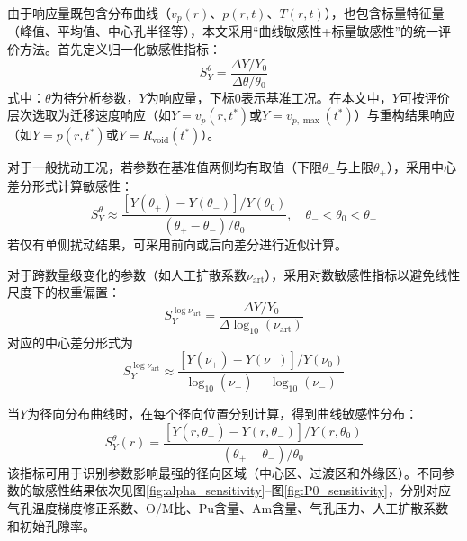 由于响应量既包含分布曲线（$v_p(r)$、$p(r,t)$、$T(r,t)$），也包含标量特征量（峰值、平均值、中心孔半径等），本文采用“曲线敏感性+标量敏感性”的统一评价方法。首先定义归一化敏感性指标：
\begin{equation}
	S_Y^\theta = \frac{\Delta Y / Y_0}{\Delta \theta / \theta_0}
	\label{eq:sensitivity_definition}
\end{equation}
式中：$\theta$为待分析参数，$Y$为响应量，下标$0$表示基准工况。在本文中，$Y$可按评价层次选取为迁移速度响应（如$Y=v_p(r,t^*)$或$Y=v_{p,\max}(t^*)$）与重构结果响应（如$Y=p(r,t^*)$或$Y=R_{\mathrm{void}}(t^*)$）。

对于一般扰动工况，若参数在基准值两侧均有取值（下限$\theta_-$与上限$\theta_+$），采用中心差分形式计算敏感性：
\begin{equation}
	S_Y^{\theta}\approx
	\frac{\left[Y(\theta_+)-Y(\theta_-)\right]/Y(\theta_0)}{\left(\theta_+-\theta_-\right)/\theta_0},
	\quad \theta_-<\theta_0<\theta_+
\end{equation}
若仅有单侧扰动结果，可采用前向或后向差分进行近似计算。

对于跨数量级变化的参数（如人工扩散系数$\nu_{\mathrm{art}}$），采用对数敏感性指标以避免线性尺度下的权重偏置：
\begin{equation}
	S_Y^{\log \nu_{\mathrm{art}}}=
	\frac{\Delta Y/Y_0}{\Delta \log_{10}(\nu_{\mathrm{art}})}
\end{equation}
对应的中心差分形式为
\begin{equation}
	S_Y^{\log \nu_{\mathrm{art}}}\approx
	\frac{\left[Y(\nu_+)-Y(\nu_-)\right]/Y(\nu_0)}{\log_{10}(\nu_+)-\log_{10}(\nu_-)}
\end{equation}

当$Y$为径向分布曲线时，在每个径向位置分别计算，得到曲线敏感性分布：
\begin{equation}
	S_Y^{\theta}(r)=
	\frac{\left[Y(r,\theta_+)-Y(r,\theta_-)\right]/Y(r,\theta_0)}{\left(\theta_+-\theta_-\right)/\theta_0}
\end{equation}
该指标可用于识别参数影响最强的径向区域（中心区、过渡区和外缘区）。不同参数的敏感性结果依次见图\ref{fig:alpha_sensitivity}--图\ref{fig:P0_sensitivity}，分别对应气孔温度梯度修正系数、O/M比、Pu含量、Am含量、气孔压力、人工扩散系数和初始孔隙率。


